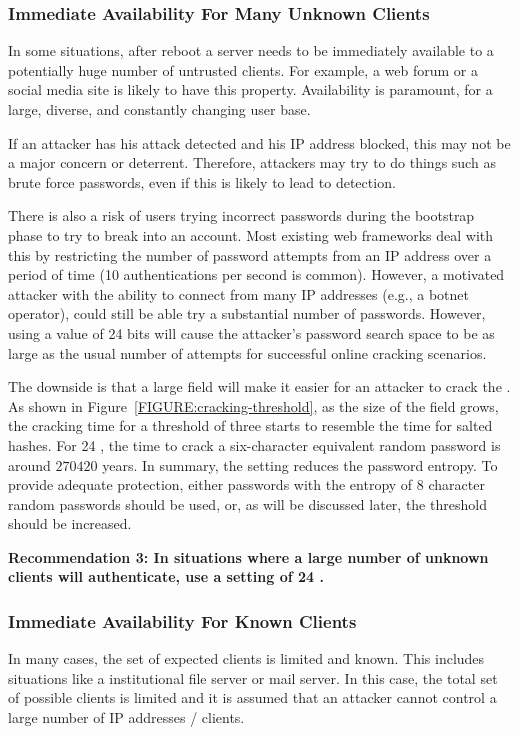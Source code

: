 \subsubsection{Immediate Availability For Many Unknown Clients}
In some situations, after
reboot a server needs to be immediately available to a potentially huge 
number of untrusted clients.  For example, a 
web forum or a social media site is likely to have this property.
Availability is paramount, for a large, diverse, and constantly changing
user base.

If an attacker has his attack detected and his IP address blocked, this 
may not be a major concern or deterrent. Therefore, attackers may try to do things such as
brute force passwords, even if this is likely to lead to detection.

There is also a risk of users trying incorrect passwords during the bootstrap
phase to try to break into an account.  Most existing web frameworks deal with
this by restricting the number of password attempts from an IP address over a
period of time (10 authentications per second is common).  However, a motivated
attacker with the ability to connect from many IP addresses (e.g., a botnet
operator), could still be able try a substantial number of passwords.
However, using a \partialbytes value of 24 bits will cause the attacker's
password search space to be as large as the usual number of attempts for
successful online cracking scenarios.




The downside is that a large \partialbytes field will make it easier for an
attacker to crack the \thresholdaccounts.  As shown in
Figure~\ref{FIGURE:cracking-threshold}, as the size of the \partialbytes field
grows, the cracking time for a threshold of three starts to resemble the time
for salted hashes. For 24 \partialbytes, the time to crack a six-character
equivalent random password is around $270420$ years. In summary, the
\partialbytes setting reduces the password entropy.  To provide adequate
protection, either passwords with the entropy of 8 character random passwords
should be used, or, as will be discussed later, the threshold should be
increased.


{\bf Recommendation 3: In situations where a large number of unknown clients
will authenticate, use a setting of 24 \partialbytes.}


\subsubsection{Immediate Availability For Known Clients}
In many cases, the set of expected clients is limited and known.
This includes situations like a institutional file server or mail server.
In this case, the total set of possible clients is limited and it is
assumed that an attacker cannot control a large number of IP addresses / 
clients.

